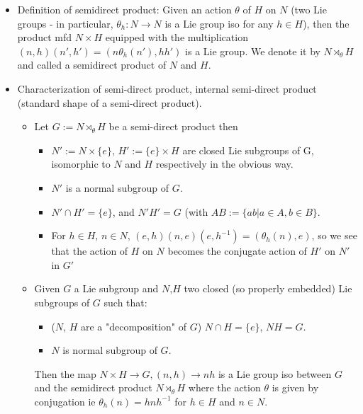 \documentclass{report}
\theoremstyle{definition}
\begin{document}
\begin{itemize}
    \item Definition of semidirect product: Given an action $\theta$ of $H$ on $N$ (two Lie groups - in particular, $\theta_h:N\to N$ is a Lie group iso for any $h\in H$), then the product mfd $N\times H$ equipped with the multiplication $(n,h)(n',h')=(n\theta_h(n'),hh')$ is a Lie group. We denote it by $N\rtimes_{\theta}H$ and called a semidirect product of $N$ and $H$.

    \item Characterization of semi-direct product, internal semi-direct product (standard shape of a semi-direct product).

    \begin{itemize}
        \item Let $G:=N\rtimes_\theta H$ be a semi-direct product then
        \begin{itemize}
            \item $N':=N\times\{e\}$, $H':=\{e\}\times H$ are closed Lie subgroups of G, isomorphic to $N$ and $H$ respectively in the obvious way.
            \item $N'$ is a normal subgroup of $G$.
            \item $N'\cap H'=\{e\}$, and $N'H'=G$ (with $AB:=\{ab|a\in A,b\in B\}$.
            \item For $h\in H$, $n\in N$, $(e,h)(n,e)(e,h^{-1})=(\theta_h(n),e)$, so we see that the action of $H$ on $N$ becomes the conjugate action of $H'$ on $N'$ in $G'$
        \end{itemize}
        \item Given $G$ a Lie subgroup and $N$,$H$ two closed (so properly embedded) Lie subgroups of $G$ such that:
        \begin{itemize}
            \item ($N$, $H$ are a "decomposition" of $G$) $N\cap H=\{e\}$, $NH=G$.
            \item $N$ is normal subgroup of $G$.
        \end{itemize}

        Then the map $N\times H\to G,(n,h)\to nh$ is a Lie group iso between $G$ and the semidirect product $N\rtimes_\theta H$ where the action $\theta$ is given by conjugation ie $\theta_h(n)=hnh^{-1}$ for $h\in H$ and $n\in N$.


\end{itemize}
\end{itemize}
\end{document}
